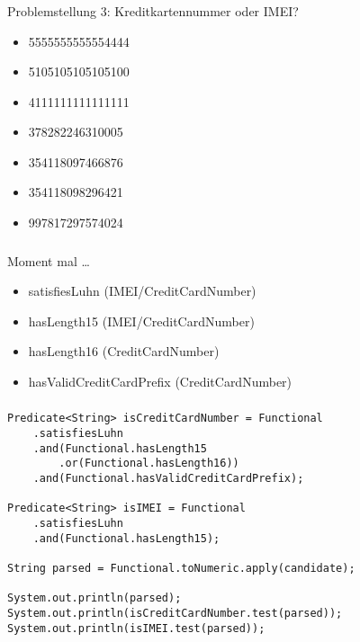 \documentclass{beamer}
\begin{document}
\begin{frame}
\frametitle{\insertpagenumber}
Problemstellung 3: Kreditkartennummer oder IMEI?
\begin{itemize}
    \item 5555555555554444
    \item 5105105105105100
    \item 4111111111111111
    \item 378282246310005
    \item 354118097466876
    \item 354118098296421
    \item 997817297574024
\end{itemize}
\end{frame}

\begin{frame}
\frametitle{\insertpagenumber}
Moment mal \ldots
\begin{itemize}
    \item satisfiesLuhn (IMEI/CreditCardNumber)
    \item hasLength15 (IMEI/CreditCardNumber)
    \item hasLength16 (CreditCardNumber)
    \item hasValidCreditCardPrefix (CreditCardNumber)
\end{itemize}

\end{frame}

\begin{frame}
\frametitle{\insertpagenumber}
\begin{center}
\end{center}
\end{frame}

\begin{frame}[fragile]
\frametitle{\insertpagenumber}
\begin{lstlisting}
Predicate<String> isCreditCardNumber = Functional
    .satisfiesLuhn
    .and(Functional.hasLength15
        .or(Functional.hasLength16))
    .and(Functional.hasValidCreditCardPrefix);

Predicate<String> isIMEI = Functional
    .satisfiesLuhn
    .and(Functional.hasLength15);

String parsed = Functional.toNumeric.apply(candidate);

System.out.println(parsed);
System.out.println(isCreditCardNumber.test(parsed));
System.out.println(isIMEI.test(parsed));
\end{lstlisting}
\end{frame}
\end{document}
